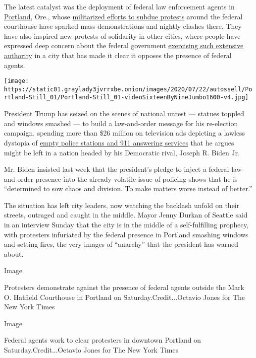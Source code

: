 The latest catalyst was the deployment of federal law enforcement agents
in
\href{https://www.nytimes3xbfgragh.onion/2020/07/28/us/portland-protests-fact-check.html}{Portland},
Ore., whose
\href{https://www.nytimes3xbfgragh.onion/2020/07/17/us/portland-protests.html}{militarized
efforts to subdue protests} around the federal courthouse have sparked
mass demonstrations and nightly clashes there. They have also inspired
new protests of solidarity in other cities, where people have expressed
deep concern about the federal government
\href{https://www.nytimes3xbfgragh.onion/2020/07/25/us/portland-federal-legal-jurisdiction-courts.html}{exercising
such extensive authority} in a city that has made it clear it opposes
the presence of federal agents.

\texttt{[image: https://static01.graylady3jvrrxbe.onion/images/2020/07/22/autossell/Portland-Still\_01/Portland-Still\_01-videoSixteenByNineJumbo1600-v4.jpg]}

President Trump has seized on the scenes of national unrest --- statues
toppled and windows smashed --- to build a law-and-order message for his
re-election campaign, spending more than \$26 million on television ads
depicting a lawless dystopia of
\href{https://www.youtube.com/watch?v=moZOrq0qL3Q}{empty police stations
and 911 answering services} that he argues might be left in a nation
headed by his Democratic rival, Joseph R. Biden Jr.

Mr. Biden insisted last week that the president's pledge to inject a
federal law-and-order presence into the already volatile issue of
policing shows that he is ``determined to sow chaos and division. To
make matters worse instead of better.''

The situation has left city leaders, now watching the backlash unfold on
their streets, outraged and caught in the middle. Mayor Jenny Durkan of
Seattle said in an interview Sunday that the city is in the middle of a
self-fulfilling prophecy, with protesters infuriated by the federal
presence in Portland smashing windows and setting fires, the very images
of ``anarchy'' that the president has warned about.

Image

Protesters demonstrate against the presence of federal agents outside
the Mark O. Hatfield Courthouse in Portland on Saturday.Credit...Octavio
Jones for The New York Times

Image

Federal agents work to clear protesters in downtown Portland on
Saturday.Credit...Octavio Jones for The New York Times

